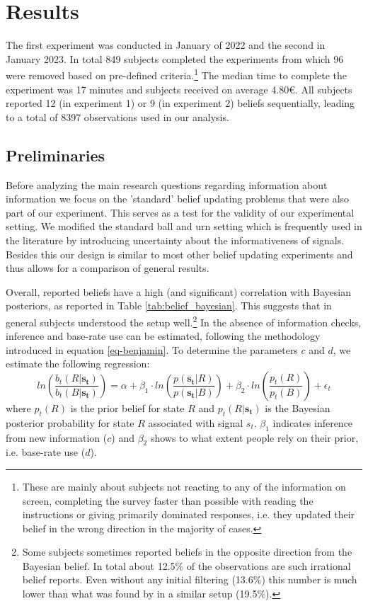 \documentclass{article}
\begin{document}
\section{Results}

The first experiment was conducted in January of 2022 and the second in January 2023. In total 849 subjects completed the experiments from which 96 were removed based on pre-defined criteria.\footnote{These are mainly about subjects not reacting to any of the information on screen, completing the survey faster than possible with reading the instructions or giving primarily dominated responses, i.e. they updated their belief in the wrong direction in the majority of cases.} The median time to complete the experiment was 17 minutes and subjects received on average 4.80\euro. All subjects reported 12 (in experiment 1) or 9 (in experiment 2) beliefs sequentially, leading to a total of 8397 observations used in our analysis.


\subsection{Preliminaries}

Before analyzing the main research questions regarding information about information we focus on the 'standard' belief updating problems that were also part of our experiment. This serves as a test for the validity of our experimental setting. We modified the standard ball and urn setting which is frequently used in the literature by introducing uncertainty about the informativeness of signals. Besides this our design is similar to most other belief updating experiments and thus allows for a comparison of general results.

Overall, reported beliefs have a high (and significant) correlation with Bayesian posteriors, as reported in Table \ref{tab:belief_bayesian}. This suggests that in general subjects understood the setup well.\footnote{Some subjects sometimes reported beliefs in the opposite direction from the Bayesian belief. In total about 12.5\% of the observations are such irrational belief reports. Even without any initial filtering (13.6\%) this number is much lower than what was found by \cite{Goncalves2021} in a similar setup (19.5\%).} In the absence of information checks, inference and base-rate use can be estimated, following the methodology introduced in equation \ref{eq-benjamin}. To determine the parameters $c$ and $d$, we estimate the following regression:
\begin{equation}
\label{eq-reg-inference}
ln(\frac{b_t(R|\mathbf{s_t})}{b_t(B|\mathbf{s_t})}) = \alpha + \beta_1 \cdot ln(\frac{p(\mathbf{s_t}|R)}{p(\mathbf{s_t}|B)}) + \beta_2 \cdot ln(\frac{p_t(R)}{p_t(B)}) + \epsilon_t
\end{equation}
where $p_t(R)$ is the prior belief for state $R$ and $p_t(R|\mathbf{s_t})$ is the Bayesian posterior probability for state $R$ associated with signal $s_t$. $\beta_1$ indicates inference from new information ($c$) and $\beta_2$ shows to what extent people rely on their prior, i.e. base-rate use ($d$). 
\end{document}
